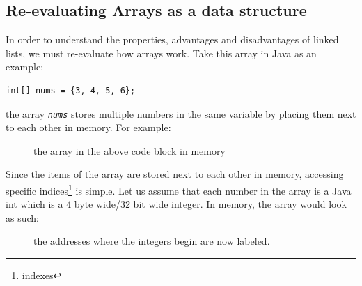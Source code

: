 \documentclass[./main.tex]{subfiles}
\begin{document}
\subsection{Re-evaluating Arrays as a data structure}

In order to understand the properties, advantages and disadvantages of linked lists, we must re-evaluate how arrays work. Take this array
in Java as an example:

\begin{verbatim}
int[] nums = {3, 4, 5, 6};
\end{verbatim}

the array \emph{\texttt{nums}} stores multiple numbers in the same variable by placing them next to each other in memory. For example:

\begin{figure}[htbp]
    \centering
    \caption{the array in the above code block in memory}
    \label{fig:array}
\end{figure}

Since the items of the array are stored next to each other in memory, accessing specific indices\footnote{indexes} is simple.
Let us assume that each number in the array is a Java {\mono int} which is a 4 byte wide/32 bit wide integer.
In memory, the array would look as such:

\begin{figure}[htbp]
    \centering
    \caption{the addresses where the integers begin are now labeled.}
    \label{fig:array-memory}
\end{figure}
\end{document}
